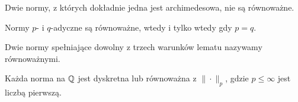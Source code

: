 \begin{wniosek}
	Dwie normy, z których dokładnie jedna jest archimedesowa, nie są równoważne.
\end{wniosek}

\begin{wniosek}
	Normy $p$- i $q$-adyczne są równoważne, wtedy i tylko wtedy gdy $p = q$.
\end{wniosek}



\begin{definicja}
	Dwie normy spełniające dowolny z trzech warunków lematu nazywamy równoważnymi.
\end{definicja}

\begin{twierdzenie}[Ostrowski, 1916]
	Każda norma na $\mathbb Q$ jest dyskretna lub równoważna z $\|\cdot\|_p$, gdzie $p \le \infty$ jest liczbą pierwszą.
\end{twierdzenie}

